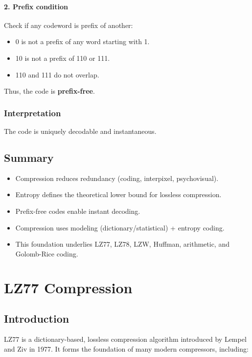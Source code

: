 \documentclass{AnantDocumentation}
\begin{document}
\paragraph{2. Prefix condition}

Check if any codeword is prefix of another:

\begin{itemize}
\item 0 is not a prefix of any word starting with 1.
\item 10 is not a prefix of 110 or 111.
\item 110 and 111 do not overlap.
\end{itemize}

Thus, the code is \textbf{prefix-free}.

\subsubsection*{Interpretation}

The code is uniquely decodable and instantaneous.

\subsection{Summary}

\begin{itemize}
\item Compression reduces redundancy (coding, interpixel, psychovisual).
\item Entropy defines the theoretical lower bound for lossless compression.
\item Prefix-free codes enable instant decoding.
\item Compression uses modeling (dictionary/statistical) + entropy coding.
\item This foundation underlies LZ77, LZ78, LZW, Huffman, arithmetic, and Golomb-Rice coding.
\end{itemize}

\section{LZ77 Compression}

\subsection{Introduction}

LZ77 is a dictionary-based, lossless compression algorithm introduced by Lempel and Ziv in 1977.  
It forms the foundation of many modern compressors, including:
\end{document}
